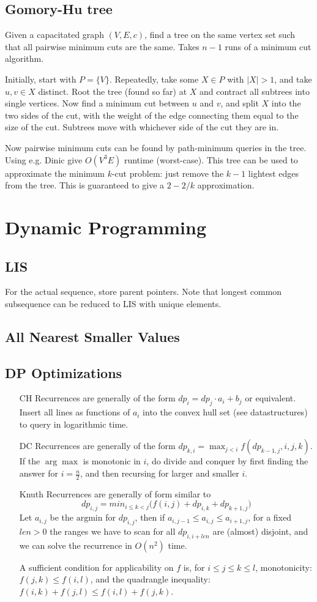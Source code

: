 \documentclass[
	a4paper,
	landscape,
	10pt,
	article
]{article}
\newcommand{\entry}[3]{
	\subsection{#1}
	#2
	\ifthenelse{\equal{#3}{}}{}{}
}
\begin{document}
\subsection{Gomory-Hu tree}
Given a capacitated graph $(V, E, c)$, find a tree on the same vertex set such
that all pairwise minimum cuts are the same. Takes $n-1$ runs of a minimum cut
algorithm.

Initially, start with $P = \{V\}$. Repeatedly, take some $X \in P$ with $|X|>1$,
and take $u, v \in X$ distinct. Root the tree (found so far) at $X$ and
contract all subtrees into single vertices. Now find a minimum cut between $u$
and $v$, and split $X$ into the two sides of the cut, with the weight of the
edge connecting them equal to the size of the cut. Subtrees move with
whichever side of the cut they are in.

Now pairwise minimum cuts can be found by path-minimum queries in the tree.
Using e.g. Dinic give $O(V^3E)$ runtime (worst-case). This tree can be used
to approximate the minimum $k$-cut problem: just remove the $k-1$ lightest
edges from the tree. This is guaranteed to give a $2-2/k$ approximation.

\section{Dynamic Programming}

\entry{LIS}
{For the actual sequence, store parent pointers. Note that longest common
subsequence can be reduced to LIS with unique elements.}
{./snippets/dp/lis.cpp}

\entry{All Nearest Smaller Values}{}{./snippets/dp/ansv.cpp}

\subsection{DP Optimizations}
\begin{enumerate}
	\item[CH] Recurrences are generally of the form
		$dp_i = dp_j \cdot a_i + b_j$ or equivalent. Insert all lines as
		functions of $a_i$ into the convex hull set (see datastructures) to
		query in logarithmic time.
	\item[DC] Recurrences are generally of the form
		$dp_{k,i} = \max_{j<i} f(dp_{k-1,j}, i, j, k)$. If the $\arg\max$ is
		monotonic in $i$, do divide and conquer by first finding the answer
		for $i = \frac{n}{2}$, and then recursing for larger and smaller $i$.
	\item[Knuth] Recurrences are generally of form similar to
		$$dp_{i,j} = min_{i\leq k<j} \big(f(i, j) + dp_{i,k} + dp_{k+1,j}\big)$$
		Let $a_{i,j}$ be the $\text{argmin}$ for $dp_{i, j}$, then if
		$a_{i,j-1} \leq a_{i, j} \leq a_{i+1,j}$, for a fixed $len > 0$ the
		ranges we have to scan for all $dp_{i, i+len}$ are (almost) disjoint,
		and we can solve the recurrence in $O(n^2)$ time.

		A sufficient condition for applicability on $f$ is, for
		$i\leq j\leq k\leq l$, monotonicity: $f(j,k) \leq f(i, l)$, and
		the quadrangle inequality: $f(i,k)+f(j,l)\leq f(i,l)+f(j,k)$.
\end{enumerate}
\end{document}
